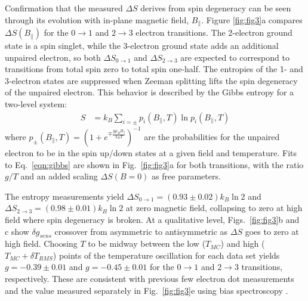 \documentclass[twocolumn,showpacs,amsmath,amssymb,prl,aps,superscriptaddress]{revtex4-1}
\begin{document}
Confirmation that the measured $\Delta S$ derives from spin degeneracy can be seen through its evolution with in-plane magnetic field, $B_\parallel$. Figure \ref{fig:fig3}a compares $\Delta S(B_\parallel)$ for the $0 \rightarrow1 $ and $2 \rightarrow 3$ electron transitions.  The 2-electron ground state is a spin singlet, while the 3-electron ground state adds an additional unpaired electron, so both $\Delta S_{0 \rightarrow 1}$ and $\Delta S_{2 \rightarrow 3}$ are expected to correspond to transitions from total spin zero to total spin one-half. The entropies of the 1- and 3-electron states are suppressed when Zeeman splitting lifts the spin degeneracy of the unpaired electron. This behavior is described by the Gibbs entropy for a two-level system:
%
\begin{align}
\label{eqn:gibbs}
        S &= k_B \sum_{i=\pm} p_{i}(B_\parallel, T) \ln{ p_{i}(B_\parallel,T) }
\end{align}
%
where $p_{\pm}(B_\parallel, T) = (1+ e^{\mp \frac{g\mu_B B_{\parallel}}{k_B T}})^{-1}$ are the probabilities for the unpaired electron to be in the spin up/down states at a given field and temperature. Fits to Eq.~\ref{eqn:gibbs} are shown in Fig.~\ref{fig:fig3}a for both transitions, with the ratio $g/T$ and an added scaling $\Delta S(B=0)$ as free parameters.

The entropy measurements yield $\Delta S_{0 \rightarrow 1}=(0.93 \pm 0.02) k_B \ln{2}$ and $\Delta S_{2 \rightarrow 3}=(0.98 \pm 0.01) k_B \ln{2}$ at zero magnetic field, collapsing to zero at high field where spin degeneracy is broken.  At a qualitative level, Figs.~\ref{fig:fig3}b and c show $\delta g_{sens}$ crossover from asymmetric to antisymmetric as $\Delta S$ goes to zero at high field. Choosing $T$ to be midway between the low ($T_{MC}$) and high ($T_{MC}+\delta T_{RMS}$) points of the temperature oscillation for each data set yields $g=-0.39 \pm 0.01 $ and $g=-0.45 \pm 0.01 $ for the $0\rightarrow 1$ and $2\rightarrow 3$ transitions, respectively. These are consistent with previous few electron dot measurements and the value measured separately in Fig.~\ref{fig:fig3}e using bias spectroscopy \cite{Cronenwett1998,Hanson2003,Zumbuhl2004}.
\end{document}
